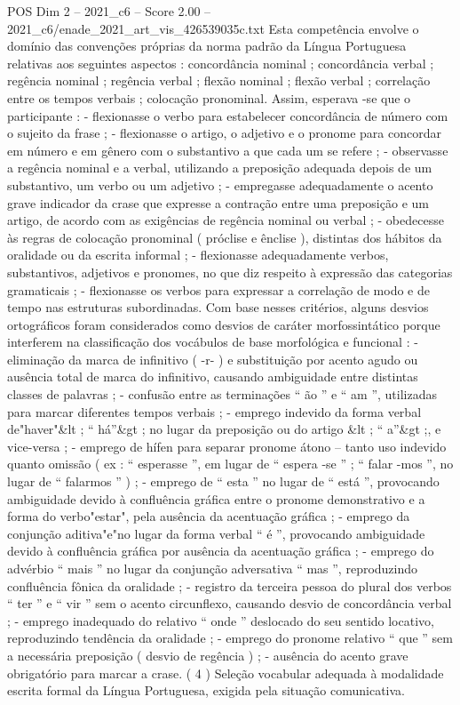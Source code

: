 \begin{textsample}{POS Dim 2 – 2021\_c6 – Score 2.00 – 2021\_c6/enade\_2021\_art\_vis\_426539035c.txt}
Esta competência envolve o domínio das convenções próprias da norma padrão da Língua Portuguesa relativas aos seguintes aspectos : concordância nominal ; concordância verbal ; regência nominal ; regência verbal ; flexão nominal ; flexão verbal ; correlação entre os tempos verbais ; colocação pronominal.
Assim, esperava -se que o participante : - flexionasse o verbo para estabelecer concordância de número com o sujeito da frase ; - flexionasse o artigo, o adjetivo e o pronome para concordar em número e em gênero com o substantivo a que cada um se refere ; - observasse a regência nominal e a verbal, utilizando a preposição adequada depois de um substantivo, um verbo ou um adjetivo ; - empregasse adequadamente o acento grave indicador da crase que expresse a contração entre uma preposição e um artigo, de acordo com as exigências de regência nominal ou verbal ; - obedecesse às regras de colocação pronominal ( próclise e ênclise ), distintas dos hábitos da oralidade ou da escrita informal ; - flexionasse adequadamente verbos, substantivos, adjetivos e pronomes, no que diz respeito à expressão das categorias gramaticais ; - flexionasse os verbos para expressar a correlação de modo e de tempo nas estruturas subordinadas.
Com base nesses critérios, alguns desvios ortográficos foram considerados como desvios de caráter morfossintático porque interferem na classificação dos vocábulos de base morfológica e funcional : - eliminação da marca de infinitivo ( -r- ) e substituição por acento agudo ou ausência total de marca do infinitivo, causando ambiguidade entre distintas classes de palavras ; - confusão entre as terminações “ ão ” e “ am ”, utilizadas para marcar diferentes tempos verbais ; - emprego indevido da forma verbal de"haver"\&lt ; “ há”\&gt ; no lugar da preposição ou do artigo \&lt ; “ a”\&gt ;, e vice-versa ; - emprego de hífen para separar pronome átono – tanto uso indevido quanto omissão ( ex : “ esperasse ”, em lugar de “ espera -se ” ; “ falar -mos ”, no lugar de “ falarmos ” ) ; - emprego de “ esta ” no lugar de “ está ”, provocando ambiguidade devido à confluência gráfica entre o pronome demonstrativo e a forma do verbo"estar", pela ausência da acentuação gráfica ; - emprego da conjunção aditiva"e"no lugar da forma verbal “ é ”, provocando ambiguidade devido à confluência gráfica por ausência da acentuação gráfica ; - emprego do advérbio “ mais ” no lugar da conjunção adversativa “ mas ”, reproduzindo confluência fônica da oralidade ; - registro da terceira pessoa do plural dos verbos “ ter ” e “ vir ” sem o acento circunflexo, causando desvio de concordância verbal ; - emprego inadequado do relativo “ onde ” deslocado do seu sentido locativo, reproduzindo tendência da oralidade ; - emprego do pronome relativo “ que ” sem a necessária preposição ( desvio de regência ) ; - ausência do acento grave obrigatório para marcar a crase. ( 4 ) Seleção vocabular adequada à modalidade escrita formal da Língua Portuguesa, exigida pela situação comunicativa.

\end{textsample}
